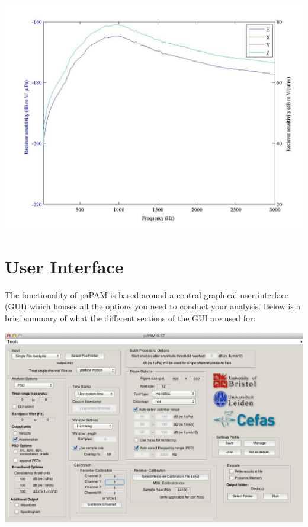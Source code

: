 \documentclass[11pt]{report}
\begin{document}
\begin{center}
\includegraphics[width = \textwidth ]{12.jpeg}
\end{center}	
	
\section{User Interface}

The functionality of paPAM is based around a central graphical user interface (GUI) which houses all the options you need to conduct your analysis.  Below is a brief summary of what the different sections of the GUI are used for:\\

\begin{center}
\includegraphics[width = \textwidth ]{3.png}
\end{center}
\end{document}
